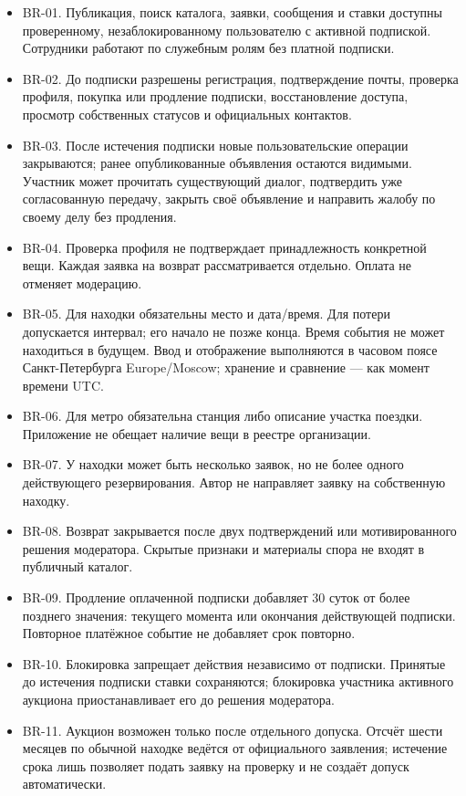 \begin{itemize}
\item BR-01. Публикация, поиск каталога, заявки, сообщения и ставки доступны проверенному, незаблокированному пользователю с активной подпиской. Сотрудники работают по служебным ролям без платной подписки.
\item BR-02. До подписки разрешены регистрация, подтверждение почты, проверка профиля, покупка или продление подписки, восстановление доступа, просмотр собственных статусов и официальных контактов.
\item BR-03. После истечения подписки новые пользовательские операции закрываются; ранее опубликованные объявления остаются видимыми. Участник может прочитать существующий диалог, подтвердить уже согласованную передачу, закрыть своё объявление и направить жалобу по своему делу без продления.
\item BR-04. Проверка профиля не подтверждает принадлежность конкретной вещи. Каждая заявка на возврат рассматривается отдельно. Оплата не отменяет модерацию.
\item BR-05. Для находки обязательны место и дата/\allowbreak{}время. Для потери допускается интервал; его начало не позже конца. Время события не может находиться в будущем. Ввод и отображение выполняются в часовом поясе Санкт-Петербурга Europe/\allowbreak{}Moscow; хранение и сравнение — как момент времени UTC.
\item BR-06. Для метро обязательна станция либо описание участка поездки. Приложение не обещает наличие вещи в реестре организации.
\item BR-07. У находки может быть несколько заявок, но не более одного действующего резервирования. Автор не направляет заявку на собственную находку.
\item BR-08. Возврат закрывается после двух подтверждений или мотивированного решения модератора. Скрытые признаки и материалы спора не входят в публичный каталог.
\item BR-09. Продление оплаченной подписки добавляет 30 суток от более позднего значения: текущего момента или окончания действующей подписки. Повторное платёжное событие не добавляет срок повторно.
\item BR-10. Блокировка запрещает действия независимо от подписки. Принятые до истечения подписки ставки сохраняются; блокировка участника активного аукциона приостанавливает его до решения модератора.
\item BR-11. Аукцион возможен только после отдельного допуска. Отсчёт шести месяцев по обычной находке ведётся от официального заявления; истечение срока лишь позволяет подать заявку на проверку и не создаёт допуск автоматически.

\end{itemize}
